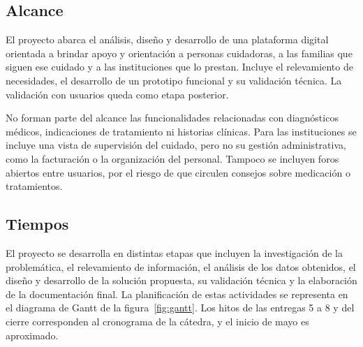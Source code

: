 \subsection{Alcance}

El proyecto abarca el análisis, diseño y desarrollo de una plataforma digital orientada a brindar apoyo y orientación a personas cuidadoras, a las familias que siguen ese cuidado y a las instituciones que lo prestan. Incluye el relevamiento de necesidades, el desarrollo de un prototipo funcional y su validación técnica. La validación con usuarios queda como etapa posterior.

No forman parte del alcance las funcionalidades relacionadas con diagnósticos médicos, indicaciones de tratamiento ni historias clínicas. Para las instituciones se incluye una vista de supervisión del cuidado, pero no su gestión administrativa, como la facturación o la organización del personal. Tampoco se incluyen foros abiertos entre usuarios, por el riesgo de que circulen consejos sobre medicación o tratamientos.

\subsection{Tiempos}

El proyecto se desarrolla en distintas etapas que incluyen la investigación de la problemática, el relevamiento de información, el análisis de los datos obtenidos, el diseño y desarrollo de la solución propuesta, su validación técnica y la elaboración de la documentación final. La planificación de estas actividades se representa en el diagrama de Gantt de la figura~\ref{fig:gantt}. Los hitos de las entregas 5 a 8 y del cierre corresponden al cronograma de la cátedra, y el inicio de mayo es aproximado.

